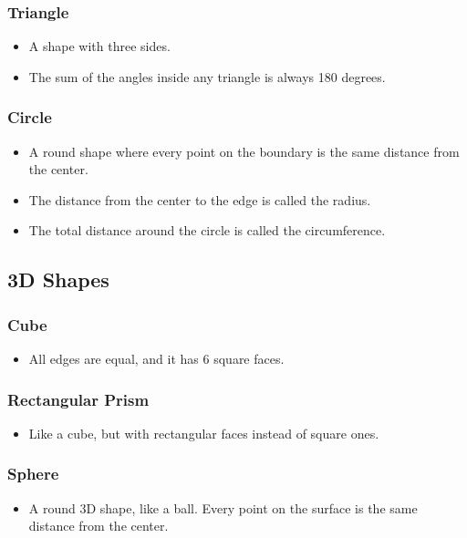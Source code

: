 \subsubsection{Triangle}
\begin{itemize}
    \item A shape with three sides.
    \item The sum of the angles inside any triangle is always 180 degrees.
\end{itemize}

\subsubsection{Circle}
\begin{itemize}
    \item A round shape where every point on the boundary is the same distance from the center.
    \item The distance from the center to the edge is called the radius.
    \item The total distance around the circle is called the circumference.
\end{itemize}

\subsection{3D Shapes}
\subsubsection{Cube}
\begin{itemize}
    \item All edges are equal, and it has 6 square faces.
\end{itemize}

\subsubsection{Rectangular Prism}
\begin{itemize}
    \item Like a cube, but with rectangular faces instead of square ones.
\end{itemize}

\subsubsection{Sphere}
\begin{itemize}
    \item A round 3D shape, like a ball. Every point on the surface is the same distance from the center.
\end{itemize}

